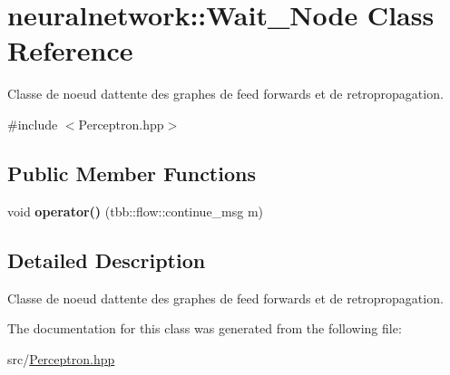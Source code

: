 \hypertarget{classneuralnetwork_1_1_wait___node}{}\section{neuralnetwork\+:\+:Wait\+\_\+\+Node Class Reference}
\label{classneuralnetwork_1_1_wait___node}


Classe de noeud d\textquotesingle{}attente des graphes de feed forwards et de retropropagation.  




{\ttfamily \#include $<$Perceptron.\+hpp$>$}

\subsection*{Public Member Functions}
\begin{DoxyCompactItemize}
\item 
\mbox{\label{classneuralnetwork_1_1_wait___node_ab3cb34a7dc8f18dd800851677390fbe5}} 
void {\bfseries operator()} (tbb\+::flow\+::continue\+\_\+msg m)
\end{DoxyCompactItemize}


\subsection{Detailed Description}
Classe de noeud d\textquotesingle{}attente des graphes de feed forwards et de retropropagation. 

The documentation for this class was generated from the following file\+:\begin{DoxyCompactItemize}
\item 
src/\mbox{\hyperlink{_perceptron_8hpp}{Perceptron.\+hpp}}\end{DoxyCompactItemize}
